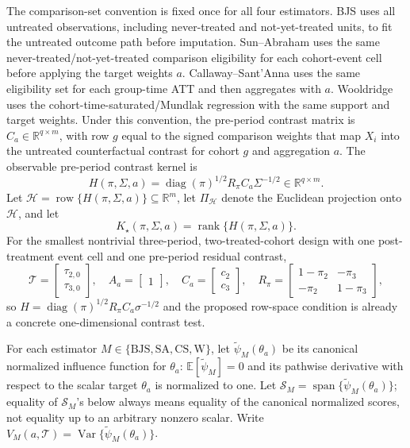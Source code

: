 \documentclass[11pt]{article}
\newcommand{\E}{\mathbb{E}}
\newcommand{\calH}{\mathcal{H}}
\newcommand{\R}{\mathbb{R}}
\theoremstyle{definition}
\theoremstyle{plain}
\theoremstyle{remark}
\begin{document}
The comparison-set convention is fixed once for all four estimators.  BJS uses
all untreated observations, including never-treated and not-yet-treated units,
to fit the untreated outcome path before imputation.  Sun--Abraham uses the
same never-treated/not-yet-treated comparison eligibility for each cohort-event
cell before applying the target weights \(a\).  Callaway--Sant'Anna uses the
same eligibility set for each group-time ATT and then aggregates with \(a\).
Wooldridge uses the cohort-time-saturated/Mundlak regression with the same
support and target weights.  Under this convention, the pre-period contrast
matrix is \(C_a\in\R^{q\times m}\), with row \(g\) equal to the signed
comparison weights that map \(X_i\) into the untreated counterfactual contrast
for cohort \(g\) and aggregation \(a\).  The observable pre-period contrast
kernel is
\[
H(\pi,\Sigma,a)=\operatorname{diag}(\pi)^{1/2} R_\pi C_a\Sigma^{-1/2}
\in\R^{q\times m}.
\]
Let \(\calH=\operatorname{row}\{H(\pi,\Sigma,a)\}\subseteq\R^m\), let
\(\Pi_{\calH}\) denote the Euclidean projection onto \(\calH\), and let
\[
K_\star(\pi,\Sigma,a)=\operatorname{rank}\{H(\pi,\Sigma,a)\}.
\]
For the smallest nontrivial three-period, two-treated-cohort design with one
post-treatment event cell and one pre-period residual contrast,
\[
\mathcal T=\begin{bmatrix}\tau_{2,0}\\ \tau_{3,0}\end{bmatrix},\quad
A_a=\begin{bmatrix}1\end{bmatrix},\quad
C_a=\begin{bmatrix}c_2\\ c_3\end{bmatrix},\quad
R_\pi=\begin{bmatrix}1-\pi_2&-\pi_3\\ -\pi_2&1-\pi_3\end{bmatrix},
\]
so \(H=\operatorname{diag}(\pi)^{1/2}R_\pi C_a\sigma^{-1/2}\) and the proposed
row-space condition is already a concrete one-dimensional contrast test.

For each estimator \(M\in\{\mathrm{BJS},\mathrm{SA},\mathrm{CS},\mathrm{W}\}\),
let \(\widetilde\psi_M(\theta_a)\) be its canonical normalized influence
function for \(\theta_a\): \(\E[\widetilde\psi_M]=0\) and its pathwise
derivative with respect to the scalar target \(\theta_a\) is normalized to one.
Let \(\mathcal S_M=\operatorname{span}\{\widetilde\psi_M(\theta_a)\}\); equality
of \(\mathcal S_M\)'s below always means equality of the canonical normalized
scores, not equality up to an arbitrary nonzero scalar.  Write
\(V_M(a,\mathcal T)=\operatorname{Var}\{\widetilde\psi_M(\theta_a)\}\).
\end{document}
